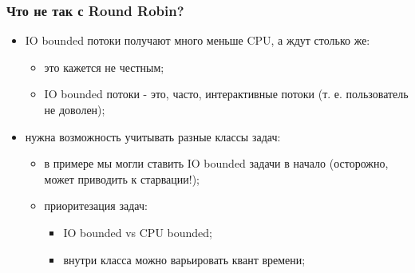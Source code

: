 \begin{frame}
\frametitle{Что не так с Round Robin?}

\begin{itemize}
  \item<1-> IO bounded потоки получают много меньше CPU, а ждут столько же:
    \begin{itemize}
      \item это кажется не честным;
      \item IO bounded потоки - это, часто, интерактивные потоки (т. е.
            пользователь не доволен);
    \end{itemize}
  \item<2-> нужна возможность учитывать разные классы задач:
    \begin{itemize}
      \item в примере мы могли ставить IO bounded задачи в начало (осторожно,
            может приводить к старвации!);
      \item приоритезация задач:
            \begin{itemize}
              \item IO bounded vs CPU bounded;
              \item внутри класса можно варьировать квант времени;
            \end{itemize}
    \end{itemize}
\end{itemize}
\end{frame}
